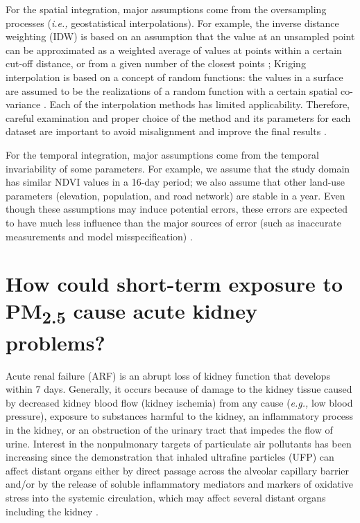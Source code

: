 \documentclass[11pt]{article}
\newcommand{\tsub}{\textsubscript}
\begin{document}
\begin{enumerate*}[{[a)]}]
{    \item For the spatial integration, major assumptions come from the oversampling processes (\textit{i.e.,} geostatistical interpolations). For example, the inverse distance weighting (IDW) is based on an assumption that the value at an unsampled point can be approximated as a weighted average of values at points within a certain cut-off distance, or from a given number of the closest points \citep{bartier1996multivariate}; Kriging interpolation is based on a concept of random functions: the values in a surface are assumed to be the realizations of a random function with a certain spatial co-variance \citep{oliver1990kriging}. Each of the interpolation methods has limited applicability. Therefore, careful examination and proper choice of the method and its parameters for each dataset are important to avoid misalignment and improve the final results \citep{mitas1999spatial}.
    
    For the temporal integration, major assumptions come from the temporal invariability of some parameters. For example, we assume that the study domain has similar NDVI values in a 16-day period; we also assume that other land-use parameters (elevation, population, and road network) are stable in a year. Even though these assumptions may induce potential errors, these errors are expected to have much less influence than the major sources of error (such as inaccurate measurements and model misspecification) \citep{xiao2017full}.
    }
\end{enumerate*}

\hdashrule{\textwidth}{0.1pt}{3mm 3pt 1mm 3pt}
\setcounter{section}{0}

\section{How could short-term exposure to \texorpdfstring{PM\tsub{2.5}}{PM2.5} cause acute kidney problems?}
Acute renal failure (ARF) is an abrupt loss of kidney function that develops within 7 days. Generally, it occurs because of damage to the kidney tissue caused by decreased kidney blood flow (kidney ischemia) from any cause (\textit{e.g.,} low blood pressure), exposure to substances harmful to the kidney, an inflammatory process in the kidney, or an obstruction of the urinary tract that impedes the flow of urine. Interest in the nonpulmonary targets of particulate air pollutants has been increasing since the demonstration that inhaled ultrafine particles (UFP) can affect distant organs either by direct passage across the alveolar capillary barrier and/or by the release of soluble inflammatory mediators and markers of oxidative stress into the systemic circulation, which may affect several distant organs including the kidney \citep{nemmar2004possible, oberdorster2005nanotoxicology, peters2006translocation, vermylen2005ambient, nemmar2013recent}. 
\end{document}
